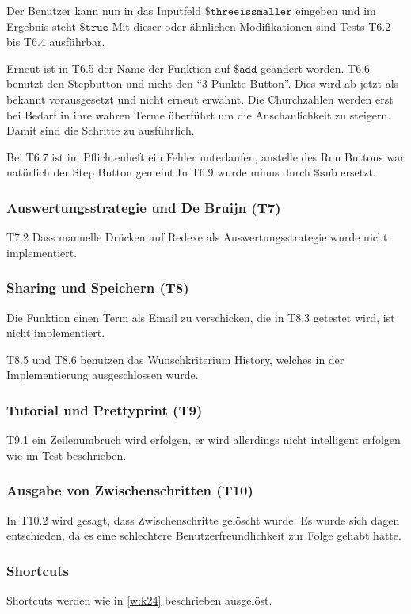 \documentclass[parskip=full,11pt,twoside]{scrartcl}
\begin{document}
Der Benutzer kann nun in das Inputfeld $\texttt{\$threeissmaller} $ eingeben und 
im Ergebnis steht $\texttt{\$true}$
Mit dieser oder ähnlichen Modifikationen sind Tests T6.2 bis T6.4 ausführbar.


Erneut ist in T6.5 der Name der Funktion auf $\texttt{\$add}$ geändert worden.
T6.6 benutzt den Stepbutton und nicht den \enquote{3-Punkte-Button}.
Dies wird ab jetzt als bekannt vorausgesetzt und nicht erneut erwähnt.
Die Churchzahlen werden erst bei Bedarf in ihre wahren Terme überführt um die
Anschaulichkeit zu steigern. Damit sind die Schritte zu ausführlich.

Bei T6.7 ist im Pflichtenheft ein Fehler unterlaufen, anstelle des Run Buttons
war natürlich der Step Button gemeint
In T6.9 wurde minus durch $\texttt{\$sub}$ ersetzt. 

\subsubsection{Auswertungsstrategie und De Bruijn (T7)}
T7.2 Dass manuelle Drücken auf Redexe als Auswertungsstrategie wurde nicht implementiert.

\subsubsection{Sharing und Speichern (T8)}

Die Funktion einen Term als Email zu verschicken, die in T8.3 getestet wird,
ist nicht implementiert.

T8.5 und T8.6 benutzen das Wunschkriterium History, welches in der Implementierung
ausgeschlossen wurde.
\subsubsection{Tutorial und Prettyprint (T9)}
T9.1 ein Zeilenumbruch wird erfolgen, er wird allerdings nicht intelligent erfolgen
wie im Test beschrieben.

\subsubsection{Ausgabe von Zwischenschritten (T10)}
In T10.2 wird gesagt, dass Zwischenschritte gelöscht wurde.
Es wurde sich dagen entschieden, da es eine schlechtere Benutzerfreundlichkeit
zur Folge gehabt hätte.

\subsubsection{Shortcuts}
Shortcuts werden wie in \ref{w:k24} beschrieben ausgelöst.
\end{document}
